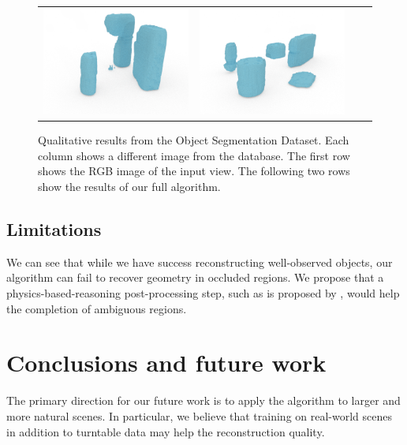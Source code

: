 \documentclass[10pt,twocolumn,letterpaper]{article}
\begin{document}
\begin{figure}
\begin{tabular}{cccc}
    \includegraphics[width=\scenewidth]{scene/cropped/learn13_op_1} &
    \includegraphics[width=\scenewidth]{scene/cropped/test45_op_1} \\
    \end{tabular}
     \caption{Qualitative results from the Object Segmentation Dataset.
     Each column shows a different image from the database.
     The first row shows the RGB image of the input view.
     The following two rows show the results of our full algorithm.
     \label{fig:osd_qual}
     }
\end{figure}

\subsection{Limitations}
We can see that while we have success reconstructing well-observed objects, our algorithm can fail to recover geometry in occluded regions.
We propose that a physics-based-reasoning post-processing step, such as is proposed by \cite{zheng-cvpr-2013, shao-siggraphasia-2014}, would help the completion of ambiguous regions.

\section{Conclusions and future work}
The primary direction for our future work is to apply the algorithm to larger and more natural scenes.
In particular, we believe that training on real-world scenes in addition to turntable data may help the reconstruction quality.
\end{document}
